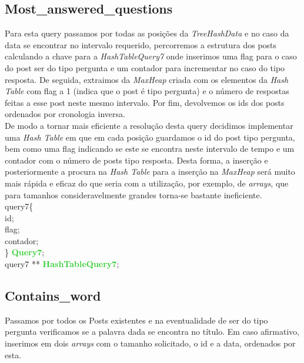 \documentclass[10pt,a4paper]{article}
\begin{document}
{\subsection{Most\_answered\_questions}
Para esta query passamos por todas as posições da \textit{TreeHashData} e no caso da data se encontrar no intervalo requerido, percorremos a estrutura dos posts calculando a chave para a \textit{HashTableQuery7} onde inserimos uma flag para o caso do post ser do tipo pergunta e um contador para incrementar no caso do tipo resposta. De seguida, extraimos da \textit{MaxHeap} criada com os elementos da \textit{Hash Table} com flag a 1 (indica que o post é tipo pergunta) e o número de respostas feitas a esse post neste mesmo intervalo. Por fim, devolvemos os ids dos posts ordenados por cronologia inversa.\\
\indent De modo a tornar mais eficiente a resolução desta query decidimos implementar uma \textit{Hash Table} em que em cada posição guardamos o id do post tipo pergunta, bem como uma flag indicando se este se encontra neste intervalo de tempo e um contador com o número de posts tipo resposta. Desta forma, a inserção e posteriormente a procura na \textit{Hash Table} para a inserção na \textit{MaxHeap} será muito mais rápida e eficaz do que seria com a utilização, por exemplo, de \textit{arrays}, que para tamanhos consideravelmente grandes torna-se bastante ineficiente.\\

\noindent {\bf{\textcolor{Emerald}{typedef struct}}} query7\{\\
    \indent {\bf{\textcolor{Emerald}{long}}} id;\\
    \indent {\bf{\textcolor{Emerald}{int}}} flag;\\
    \indent {\bf{\textcolor{Emerald}{int}}} contador;\\
\} {\bf{\textcolor{LimeGreen}{Query7}}};\\

\noindent {\bf{\textcolor{Emerald}{typedef struct}}} query7 ** {\bf{\textcolor{LimeGreen}{HashTableQuery7}}};

\subsection{Contains\_word} 
Passamos por todos os Posts existentes e na eventualidade de ser do tipo pergunta verificamos se a palavra dada se encontra no título. Em caso afirmativo, inserimos em dois \textit{arrays} com o tamanho solicitado, o id e a data, ordenados por esta.

}
\end{document}
